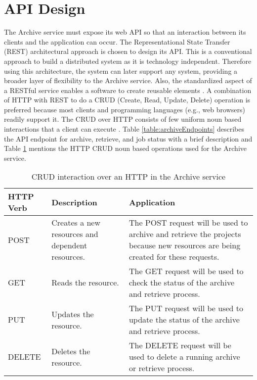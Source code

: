 \section{API Design}
\label{section:APIDesign}
    The Archive service must expose its web API so that an interaction between its clients and the application can occur.
    The Representational State Transfer (REST) \cite[Chapter.~5]{REST} architectural approach is chosen to design its API. This is a 
    conventional approach to build a distributed system as it is technology independent. Therefore using this architecture, the system can later 
    support any system, providing a broader layer of flexibility to the Archive service. 
    Also, the standardized aspect of a RESTful service enables a software to create reusable elements \cite{RESTThesis}. A combination of HTTP with REST 
    to do a CRUD (Create, Read, Update, Delete) operation is preferred because most clients and programming languages (e.g., web browsers) readily support it.
    The CRUD over HTTP consists of few uniform noun based interactions that a client can execute \cite[p.~13]{RESTThesis}.
    Table \ref{table:archiveEndpoints} describes the API endpoint for archive, retrieve, and job status with a brief description and 
    Table \ref{table:curdHttp} mentions the HTTP CRUD noun based operations used for the Archive service.

    \begin{table}[H]
        \centering
        \begin{tabular}{|p{2cm}|p{4cm}|p{7.5cm}|}
            \hline
                \textbf{HTTP Verb}  & \textbf{Description} & \textbf{Application}\\
            \hline
                POST & 
                Creates a new resources and dependent resources.
                & The POST request will be used to archive and retrieve the projects because new resources are being created for these requests.\\
            \hline
                GET & Reads the resource. & The GET request will be used to check the status of the archive and retrieve process. \\
            \hline
            PUT & Updates the resource. & The PUT request will be used to update the status of the archive and retrieve process. \\
            \hline
                DELETE & Deletes the resource. & The DELETE request will be used to delete a running archive or retrieve process. \\                
            \hline
        \end{tabular}
        \caption{CRUD interaction over an HTTP in the Archive service}
        \label{table:curdHttp}     
    \end{table}   
    
